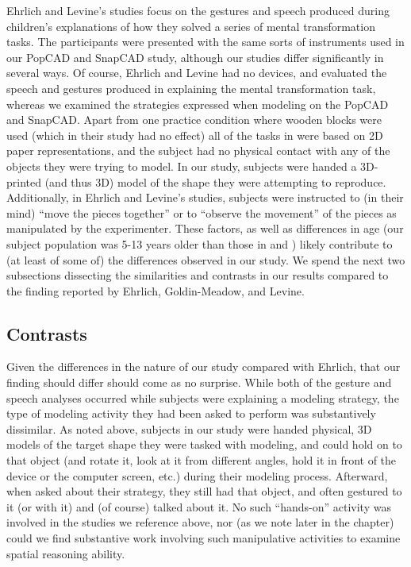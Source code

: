 Ehrlich and Levine's studies focus on the gestures and speech produced during
children's explanations of how they solved a series of mental transformation
tasks. The participants were presented with the same sorts of instruments used
in our PopCAD and SnapCAD study, although our studies differ significantly in
several ways. Of course, Ehrlich and Levine had no devices, and evaluated the
speech and gestures produced in explaining the mental transformation task,
whereas we examined the strategies expressed when modeling on the PopCAD and
SnapCAD. Apart from one practice condition where wooden blocks were used (which
in their study had no effect) all of the tasks in \cite{ehrlich2006importance}
were based on 2D paper representations, and the subject had no physical contact
with any of the objects they were trying to model. In our study, subjects were
handed a 3D-printed (and thus 3D) model of the shape they were attempting to
reproduce. Additionally, in Ehrlich and Levine's studies, subjects were
instructed to (in their mind) ``move the pieces together'' or to ``observe the
movement'' of the pieces as manipulated by the experimenter. These factors, as
well as differences in age (our subject population was 5-13 years older than
those in \cite{levine1999early} and \cite{ehrlich2006importance}) likely
contribute to (at least of some of) the differences observed in our study. We
spend the next two subsections dissecting the similarities and contrasts in our
results compared to the finding reported by Ehrlich, Goldin-Meadow, and Levine.


\subsection{Contrasts}

Given the differences in the nature of our study compared with Ehrlich, that our
finding should differ should come as no surprise. While both of the gesture and
speech analyses occurred while subjects were explaining a modeling strategy, the
type of modeling activity they had been asked to perform was substantively
dissimilar. As noted above, subjects in our study were handed physical, 3D
models of the target shape they were tasked with modeling, and could hold on to
that object (and rotate it, look at it from different angles, hold it in front
of the device or the computer screen, etc.) during their modeling process.
Afterward, when asked about their strategy, they still had that object, and
often gestured to it (or with it) and (of course) talked about it. No such
``hands-on'' activity was involved in the studies we reference above, nor (as
we note later in the chapter) could we find substantive work involving such
manipulative activities to examine spatial reasoning ability. 

